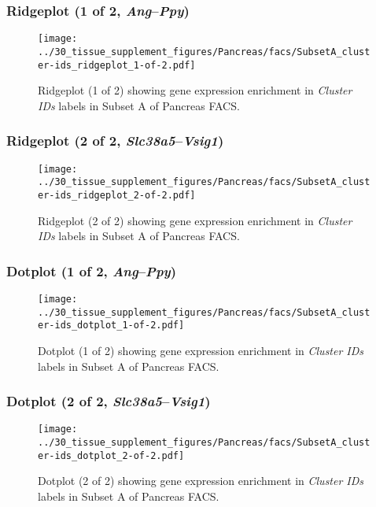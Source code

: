 \clearpage

\subsubsection{Ridgeplot (1 of 2, \emph{Ang}--\emph{Ppy})}
\begin{figure}[h]
\centering
\texttt{[image: ../30\_tissue\_supplement\_figures/Pancreas/facs/SubsetA\_cluster-ids\_ridgeplot\_1-of-2.pdf]}

\caption{ Ridgeplot (1 of 2)  showing gene expression enrichment in \emph{Cluster IDs} labels in Subset A of Pancreas FACS. }
\end{figure}


\clearpage

\subsubsection{Ridgeplot (2 of 2, \emph{Slc38a5}--\emph{Vsig1})}
\begin{figure}[h]
\centering
\texttt{[image: ../30\_tissue\_supplement\_figures/Pancreas/facs/SubsetA\_cluster-ids\_ridgeplot\_2-of-2.pdf]}

\caption{ Ridgeplot (2 of 2)  showing gene expression enrichment in \emph{Cluster IDs} labels in Subset A of Pancreas FACS. }
\end{figure}


\clearpage

\subsubsection{Dotplot (1 of 2, \emph{Ang}--\emph{Ppy})}
\begin{figure}[h]
\centering
\texttt{[image: ../30\_tissue\_supplement\_figures/Pancreas/facs/SubsetA\_cluster-ids\_dotplot\_1-of-2.pdf]}

\caption{ Dotplot (1 of 2)  showing gene expression enrichment in \emph{Cluster IDs} labels in Subset A of Pancreas FACS. }
\end{figure}


\clearpage

\subsubsection{Dotplot (2 of 2, \emph{Slc38a5}--\emph{Vsig1})}
\begin{figure}[h]
\centering
\texttt{[image: ../30\_tissue\_supplement\_figures/Pancreas/facs/SubsetA\_cluster-ids\_dotplot\_2-of-2.pdf]}

\caption{ Dotplot (2 of 2)  showing gene expression enrichment in \emph{Cluster IDs} labels in Subset A of Pancreas FACS. }
\end{figure}


